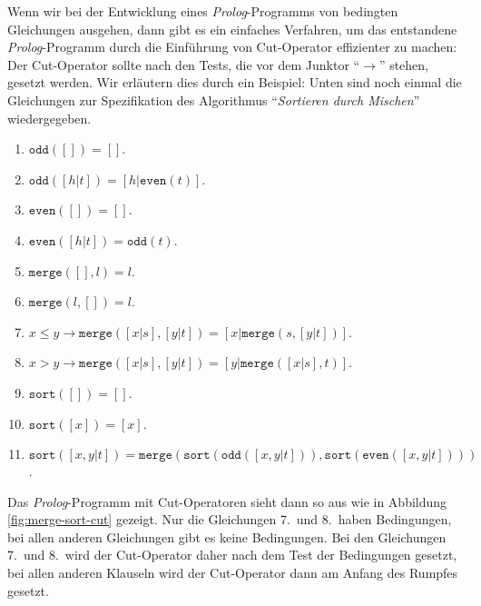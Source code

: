 Wenn wir bei der Entwicklung eines \textsl{Prolog}-Programms von bedingten Gleichungen
ausgehen, dann gibt es ein einfaches Verfahren, um das entstandene
\textsl{Prolog}-Programm durch die Einführung von Cut-Operator effizienter zu machen:
Der Cut-Operator sollte nach den Tests, die vor dem Junktor ``$\rightarrow$'' stehen,
gesetzt werden.  Wir erläutern dies durch ein Beispiel:  Unten sind noch einmal die
Gleichungen zur Spezifikation des Algorithmus ``\emph{Sortieren durch Mischen}'' wiedergegeben.
\begin{enumerate}
\item $\mathtt{odd}([]) = []$.
\item $\mathtt{odd}([h|t]) = [h|\mathtt{even}(t)]$.
\item $\mathtt{even}([]) = []$.
\item $\mathtt{even}([h|t]) = \mathtt{odd}(t)$.
\item $\mathtt{merge}([], l) = l$.
\item $\mathtt{merge}(l, []) = l$.
\item $x \leq y \rightarrow \mathtt{merge}([x|s], [y|t]) = [x|\mathtt{merge}(s, [y|t])]$.
\item $x  >   y \rightarrow \mathtt{merge}([x|s], [y|t]) = [y|\mathtt{merge}([x|s], t)]$.
\item $\mathtt{sort}([]) = []$.
\item $\mathtt{sort}([x]) = [x]$.
\item $\mathtt{sort}([x,y|t]) = \mathtt{merge}( \mathtt{sort}(\mathtt{odd}([x,y|t])), \mathtt{sort}(\mathtt{even}([x,y|t])))$.
\end{enumerate}
Das \textsl{Prolog}-Programm mit Cut-Operatoren sieht dann so aus wie in Abbildung
\ref{fig:merge-sort-cut} gezeigt.  Nur die Gleichungen 7.~und 8.~haben Bedingungen, bei
allen anderen Gleichungen gibt es keine Bedingungen.  Bei den Gleichungen 7.~und 8.~wird
der Cut-Operator daher nach dem Test der Bedingungen gesetzt, bei allen anderen Klauseln
wird der Cut-Operator dann am Anfang des Rumpfes gesetzt.

